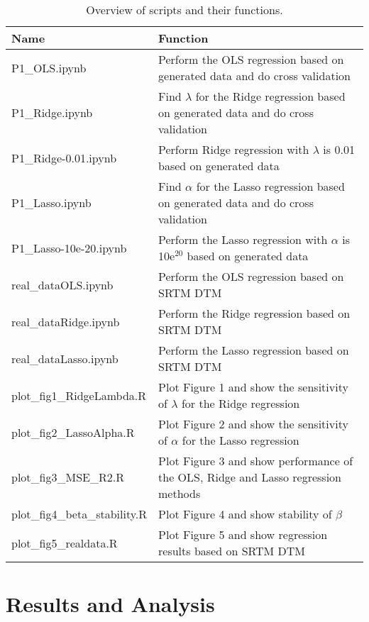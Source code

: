 \documentclass[a4paper]{article}
\begin{document}
\begin{table}[htbp]
\centering
\small
\setlength\tabcolsep{2pt}
\caption{Overview of scripts and their functions.}
\label{tabScripts}
\begin{tabular}{ll}
\hline
Name                 & Function                                                               \\
\hline
P1\_OLS.ipynb      & Perform the OLS regression based on generated data and do cross validation                                                         \\
P1\_Ridge.ipynb      & Find $\lambda$ for the Ridge regression based on generated data and do cross validation                                                         \\
P1\_Ridge-0.01.ipynb & Perform Ridge regression with $\lambda$ is 0.01 based on generated data \\
P1\_Lasso.ipynb      & Find $\alpha$ for the Lasso regression based on generated data and do cross validation                                                         \\
P1\_Lasso-10e-20.ipynb & Perform the Lasso regression with $\alpha$ is 10e$^{20}$ based on generated data \\
real\_dataOLS.ipynb & Perform the OLS regression based on SRTM DTM    \\
real\_dataRidge.ipynb & Perform the Ridge regression based on SRTM DTM    \\
real\_dataLasso.ipynb & Perform the Lasso regression based on SRTM DTM    \\
plot\_fig1\_RidgeLambda.R & Plot Figure  1 and show the sensitivity of $\lambda$ for the Ridge regression     \\
plot\_fig2\_LassoAlpha.R & Plot Figure  2 and show the sensitivity of $\alpha$ for the Lasso regression     \\
plot\_fig3\_MSE\_R2.R & Plot Figure  3 and show performance of the OLS, Ridge and Lasso regression methods \\
plot\_fig4\_beta\_stability.R & Plot Figure  4 and show stability of $\beta$ \\
plot\_fig5\_realdata.R & Plot Figure  5 and show regression results based on SRTM DTM \\
\hline
\end{tabular}
\end{table}

\section{Results and Analysis}\label{sec:analysis}
\end{document}
